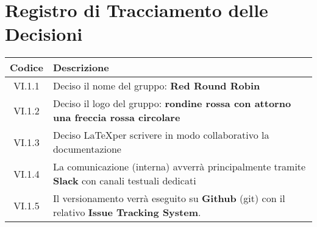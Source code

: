 \section*{Registro di Tracciamento delle Decisioni}

\begin{center}
	\begin{longtable}{|c|l|}
	\hline
	\rowcolor{lighter-grayer}
	\textbf{Codice} & \textbf{Descrizione} \\
	\hline
	\endfirsthead


	\hline
	VI.1.1 & Deciso il nome del gruppo: \textbf{Red Round Robin} \\
	\hline
	VI.1.2 & Deciso il logo del gruppo: \textbf{rondine rossa con attorno una freccia rossa circolare} \\
	\hline
	VI.1.3 & Deciso \LaTeX per scrivere in modo collaborativo la documentazione \\
	\hline
	VI.1.4 & La comunicazione (interna) avverrà principalmente tramite \textbf{Slack} con canali testuali dedicati  \\
	\hline
	VI.1.5 & Il versionamento verrà eseguito su \textbf{Github} (git) con il relativo \textbf{Issue Tracking System}.  \\
	\hline

	\end{longtable}
\end{center}